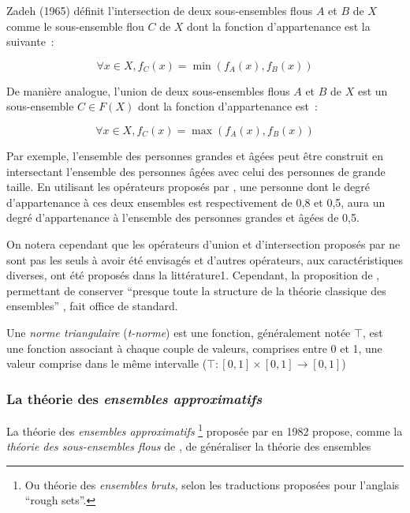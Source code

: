 Zadeh (1965) définit l’intersection de deux sous-ensembles flous $A$
et $B$ de $X$ comme le sous-ensemble flou $C$ de $X$ dont la fonction
d’appartenance est la suivante :

\begin{equation}
  ∀x ∈ X, f_C (x) = \min(f_A(x), f_B(x))
\end{equation}

De manière analogue, l’union de deux sous-ensembles flous $A$ et $B$
de $X$ est un sous-ensemble $C ∈ F(X)$ dont la fonction d’appartenance
est :

\begin{equation}
  ∀x ∈ X, f_C (x) = \max(f_A(x), f_B(x))
\end{equation}

Par exemple, l’ensemble des personnes grandes et âgées peut être
construit en intersectant l’ensemble des personnes âgées avec celui
des personnes de grande taille. En utilisant les opérateurs proposés
par \textcite{Zadeh1965}, une personne dont le degré d’appartenance à
ces deux ensembles est respectivement de 0,8 et 0,5, aura un degré
d’appartenance à l’ensemble des personnes grandes et âgées de 0,5.

On notera cependant que les opérateurs d’union et d’intersection
proposés par \textcite{Zadeh1965} ne sont pas les seuls à avoir été
envisagés et d’autres opérateurs, aux caractéristiques diverses, ont
été proposés dans la littérature1. Cependant, la proposition de
\textcite{Zadeh1965}, permettant de conserver \enquote{presque toute
  la structure de la théorie classique des ensembles}
\autocite{Bouchon-Meunier2007}, fait office de standard.

Une \emph{norme triangulaire} (\emph{t-norme}) est une fonction,
généralement notée $\top$, est une fonction associant à chaque couple
de valeurs, comprises entre 0 et 1, une valeur comprise dans le même
intervalle (\ie $\top : [0,1] × [0,1] \rightarrow [0,1]$)


\subsubsection{La théorie des \emph{ensembles approximatifs}}


La théorie des \emph{ensembles approximatifs} \footnote{Ou théorie des
  \emph{ensembles bruts,} selon les traductions proposées pour
  l'anglais \enquote{rough sets}.} proposée par \textcite{Pawlak} en
1982 propose, comme la \emph{théorie des sous-ensembles flous} de
\textcite{Zadeh1965}, de généraliser la théorie des ensembles

